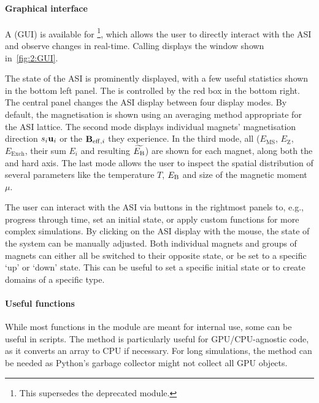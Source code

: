 \paragraph{Graphical interface}
A  (GUI) is available for \hotspice\footnote{
	This supersedes the deprecated  module.
}, which allows the user to directly interact with the ASI and observe changes in real-time.
Calling  displays the window shown in~\cref{fig:2:GUI}. \par
The state of the ASI is prominently displayed, with a few useful statistics shown in the bottom left panel.
The  is controlled by the red box in the bottom right.
The central panel changes the ASI display between four display modes.
By default, the magnetisation is shown using an averaging method appropriate for the ASI lattice.
The second mode displays individual magnets' magnetisation direction $s_i \boldsymbol{\mathbf{u}}_i$ or the  $\boldsymbol{\mathbf{B}}_{\mathrm{eff},i}$ they experience.
In the third mode, all  ($E_\mathrm{MS}$, $E_\mathrm{Z}$, $E_\mathrm{Exch}$, their sum $E_i$ and resulting $\widetilde{E_\mathrm{B}}$) are shown for each magnet, along both the  and hard axis.
The last mode allows the user to inspect the spatial distribution of several parameters like the temperature $T$,  $E_\mathrm{B}$ and size of the magnetic moment $\mu$.

The user can interact with the ASI via buttons in the rightmost panels to, e.g., progress through time, set an initial state, or apply custom functions for more complex simulations.
By clicking on the ASI display with the mouse, the state of the system can be manually adjusted.
Both individual magnets and groups of magnets can either all be switched to their opposite state, or be set to a specific `up' or `down' state.
This can be useful to set a specific initial state or to create domains of a specific type.

\paragraph{Useful functions}
While most functions in the \textbf{} module are meant for internal use, some can be useful in scripts.
The  method is particularly useful for GPU/CPU-agnostic code, as it converts an array to CPU if necessary.
For long simulations, the  method can be needed as Python's garbage collector might not collect all GPU objects.
